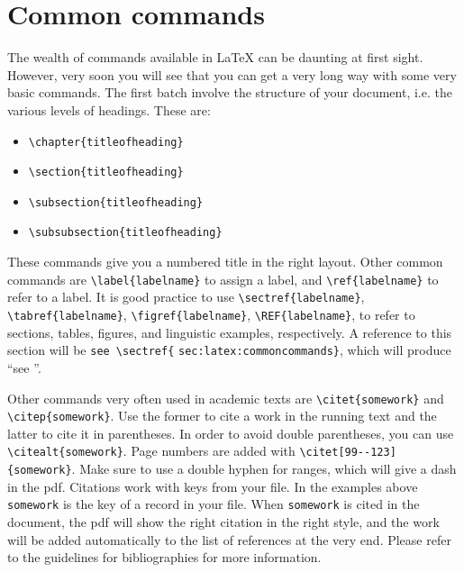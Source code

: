 \section{Common commands}\label{sec:latex:commoncommands}
The wealth of commands available in \LaTeX\xspace can be daunting at first sight. However, very soon you will see that you can get a very long way with some very basic commands. The first batch involve the structure of your document, i.e. the various levels of headings. These are:
\begin{itemize}
\item \verb+\chapter{titleofheading}+
\item \verb+\section{titleofheading}+
\item \verb+\subsection{titleofheading}+
\item \verb+\subsubsection{titleofheading}+
\end{itemize}

These commands give you a numbered title in the right layout.
Other common commands are
\verb+\label{labelname}+
to assign a label, and
\verb+\ref{labelname}+
to refer to a label. It is good practice to use
\verb+\sectref{labelname}+,
\verb+\tabref{labelname}+,
\verb+\figref{labelname}+,
\verb+\REF{labelname}+,
to refer to sections, tables, figures, and linguistic examples, respectively. A reference to this section will be \verb+see \sectref{+ \verb+sec:latex:commoncommands}+, which will produce ``see ''.

Other commands very often used in academic texts are \verb+\citet{somework}+ and \verb+\citep{somework}+. Use the former to cite a work in the running text and the latter to cite it in parentheses. In order to avoid double parentheses, you can use  \verb+\citealt{somework}+. Page numbers are added with \verb+\citet[99--123]{somework}+. Make sure to use a double hyphen for ranges, which will give a dash in the pdf. Citations work with keys from your \bibtex file. In the examples above \verb+somework+ is the key of a record in your \bibtex file. When \verb+somework+ is cited in the document, the pdf will show the right citation in the right style, and the work will be added automatically to the list of references at the very end. Please refer to the guidelines for bibliographies for more information.


